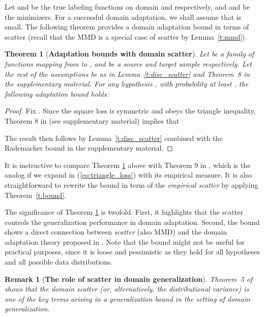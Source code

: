 \documentclass[10pt,journal,compsoc]{IEEEtran}
\newtheorem{thm}{Theorem}
\newtheorem{rem}{Remark}
\begin{document}
Let  and  be the true labeling functions on domain  and  respectively, 
and  and  be the minimizers.
For a successful domain adaptation, we shall assume that  is small.
The following theorem provides a domain adaptation bound in terms of scatter (recall that the MMD is a special case of scatter by Lemma~\ref{t:mmd}).

\begin{thm}[\textbf{Adaptation bounds with domain scatter}]
\label{t:adapt_bound}
Let  be a family of functions mapping from  to ,
 and  be a source and target sample respectively.
Let the rest of the assumptions be as in Lemma~\ref{t:disc_scatter} and Theorem~8 in the supplementary material.
For any hypothesis , with probability at least , the following adaptation bound holds:

\end{thm}
\begin{proof}
Fix . Since the square loss is symmetric and obeys the triangle inequality, Theorem 8 in \cite{Mansour2009} (see supplementary material) implies that

The result then follows by Lemma~\ref{t:disc_scatter} combined with the Rademacher bound in the supplementary material.
\end{proof}
\noindent It is instructive to compare Theorem \ref{t:adapt_bound} above with Theorem 9 in \cite{Mansour2009}, 
which is the analog if we expand  in (\ref{eq:triangle_loss}) with its empirical measure.
It is also straightforward to rewrite the bound in term of the \emph{empirical scatter}  by applying Theorem~\ref{t:bound}.

The significance of Theorem \ref{t:adapt_bound} is twofold. 
First, it highlights that the scatter  controls the generalization performance in domain adaptation.
Second, the bound shows a direct connection between \emph{scatter} (also MMD) and the domain adaptation theory proposed in \cite{Mansour2009}.
Note that the bound might not be useful for practical purposes, since it is loose and pessimistic as they hold for all hypotheses and all possible data distributions.


\begin{rem}[\textbf{The role of scatter in domain generalization}]\label{rem:gen_scatter}
 Theorem~5 of \cite{Muandet2013} shows that the domain scatter (or, alternatively, the distributional variance) is one of the key terms arising in a generalization bound in the setting of domain generalization.  
\end{rem}
\end{document}
